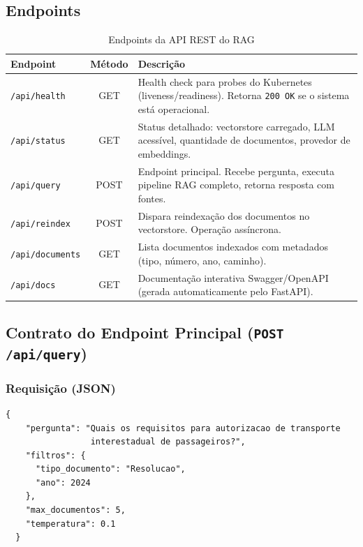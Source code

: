 \documentclass[12pt, a4paper]{article}
\begin{document}
\subsection{Endpoints}

\begin{table}[H]
\centering
\small
\caption{Endpoints da API REST do RAG}
\label{tab:endpoints}
\begin{tabularx}{\textwidth}{l c X}
\toprule
\textbf{Endpoint} & \textbf{Método} & \textbf{Descrição} \\
\midrule
\texttt{/api/health} & GET & Health check para probes do Kubernetes (liveness/readiness). Retorna \texttt{200 OK} se o sistema está operacional. \\
\texttt{/api/status} & GET & Status detalhado: vectorstore carregado, LLM acessível, quantidade de documentos, provedor de embeddings. \\
\texttt{/api/query} & POST & Endpoint principal. Recebe pergunta, executa pipeline RAG completo, retorna resposta com fontes. \\
\texttt{/api/reindex} & POST & Dispara reindexação dos documentos no vectorstore. Operação assíncrona. \\
\texttt{/api/documents} & GET & Lista documentos indexados com metadados (tipo, número, ano, caminho). \\
\texttt{/api/docs} & GET & Documentação interativa Swagger/OpenAPI (gerada automaticamente pelo FastAPI). \\
\bottomrule
\end{tabularx}
\end{table}

\subsection{Contrato do Endpoint Principal (\texttt{POST /api/query})}

\subsubsection*{Requisição (JSON)}

\begin{lstlisting}[caption={Corpo da requisição para o endpoint /api/query}, label=lst:request]
  {
    "pergunta": "Quais os requisitos para autorizacao de transporte
                 interestadual de passageiros?",
    "filtros": {
      "tipo_documento": "Resolucao",
      "ano": 2024
    },
    "max_documentos": 5,
    "temperatura": 0.1
  }
\end{lstlisting}
\end{document}
